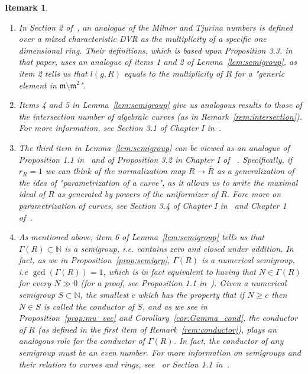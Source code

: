 \documentclass{article}
\newtheorem{remark}[theorem]{Remark}
\numberwithin{theorem}{section}
\begin{document}
\begin{remark}\label{rem:semigroup}
\begin{enumerate}
    \item \textup{In Section 2 of~\cite{svoray2025detecting}, an analogue of the Milnor and Tjurina numbers is defined over a mixed characteristic DVR as the multiplicity of a specific one dimensional ring. Their definitions, which is based upon Proposition 3.3. in that paper, uses an analogue of items 1 and 2 of Lemma~\ref{lem:semigroup}, as item 2 tells us that $l(g,R)$ equals to the multiplicity of $R$ for a "generic element in $\mathfrak{m} \setminus \mathfrak{m}^2$".}
    \item \textup{Items 4 and 5 in Lemma~\ref{lem:semigroup} give us analogous results to those of the intersection number of algebraic curves (as in Remark~\ref{rem:intersection}). For more information, see Section 3.1 of Chapter I in~\cite{greuel2007introduction}.  }
    \item     \textup{The third item in Lemma~\ref{lem:semigroup} can be viewed as an analogue of Proposition 1.1 in~\cite{ploski1995milnor} and of Proposition 3.2 in Chapter I of ~\cite{greuel2007introduction}. Specifically, if $r_R=1$ we can think of the normalization map $R \to \overline{R}$ as a generalization of the idea of "parametrization of a curve", as it allows us to write the maximal ideal of $R$ as generated by powers of the uniformizer of $R$. Fore more on parametrization of curves, see Section 3.4 of Chapter I in~\cite{greuel2007introduction} and Chapter 1 of~\cite{campillo2006algebroid}.}
    \item \textup{As mentioned above, item 6 of Lemma~\ref{lem:semigroup} tells us that $\Gamma(R) \subset \mathbb{N}$ is a semigroup, i.e. contains zero and closed under addition. In fact, as we in Proposition~\ref{prop:semigrp}, $\Gamma(R)$ is a numerical semigroup, i.e $\gcd(\Gamma(R))=1$, which is in fact equivalent to having that $N \in \Gamma(R)$ for every $N \gg 0$ (for a proof, see Proposition 1.1 in~\cite{zariski2006moduli}). Given a numerical semigroup $S \subset \mathbb{N}$, the smallest $c$ which has the property that  if $N \geq c$ then $N \in S$ is called the conductor of $S$, and as we see in Proposition~\ref{prop:mu_vec} and Corollary~\ref{cor:Gamma_cond}, the conductor of $R$ (as defined in the first item of Remark~\ref{rem:conductor}), plays an analogous role for the conductor of $\Gamma(R)$. In fact, the conductor of any semigroup must be an even number. For more information on semigroups and their relation to curves and rings, see~\cite{assi2020numerical} or Section 1.1 in~\cite{barroso2012approach}.}
\end{enumerate}
\end{remark}
\end{document}
